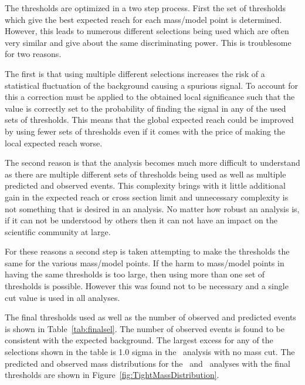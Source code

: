 
The thresholds are optimized in a two step process. First the set of thresholds which give the best expected reach for each mass/model point is determined. However, this leads
to numerous different selections being used which are often very similar and give about the same discriminating power. This is troublesome for two reasons. 

The first is that using multiple different selections increases the risk of a statistical fluctuation of the background causing a spurious signal. 
To account for this a correction
must be applied to the obtained local significance such that the value is correctly set to the probability of finding the signal in any of the used sets of thresholds. This
means that the global expected reach could be improved by using fewer sets of thresholds even if it comes with the price of making the local expected reach worse.

The second reason is that the analysis becomes much more difficult to understand as there are multiple different sets of thresholds being used as well as multiple predicted and 
observed events. This complexity brings with it little additional gain in the expected reach or cross section limit and unnecessary complexity is not something that
is desired in an analysis. No matter how robust an analysis is, if it can not be 
understood by others then it can not have an impact on the scientific community at large.

For these reasons a second step is taken attempting to make the thresholds the same for the various mass/model points. If the harm to mass/model points in having the
same thresholds is too large, then using more than one set of thresholds is possible. 
However this was found not to be necessary and a single cut value is used in all analyses. 

The final thresholds used as well as the number of
observed and predicted events is shown in Table~\ref{tab:finalsel}. 
The number of observed events is found to be consistent with the expected background.
The largest excess for any of the selections shown in the table is 1.0 sigma in the \tkonly\ analysis with no mass cut.
The predicted and observed mass distributions for the \tkonly\ and \tktof\ analyses
with the final thresholds are shown in Figure~\ref{fig:TightMassDistribution}. 

